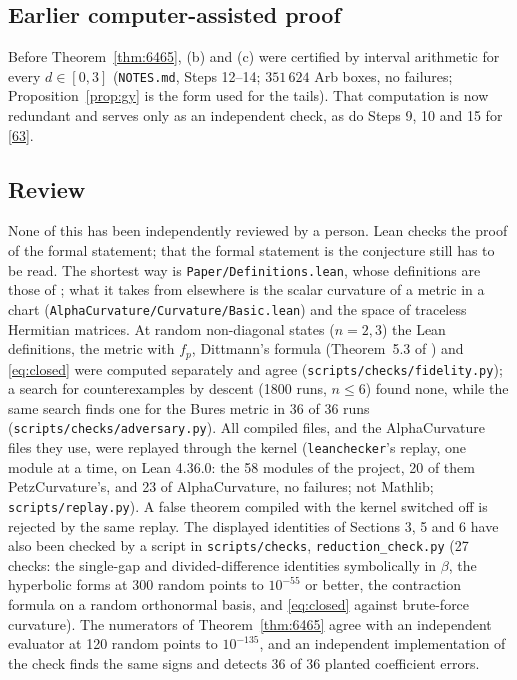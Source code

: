 \documentclass[11pt]{amsart}
\theoremstyle{definition}
\numberwithin{equation}{section}
\begin{document}
\subsection*{Earlier computer-assisted proof} Before Theorem~\ref{thm:6465}, (b) and (c) were certified by interval arithmetic for every $d\in[0,3]$ (\texttt{NOTES.md}, Steps 12--14; $351\,624$ Arb boxes, no failures; Proposition~\ref{prop:gy} is the form used for the tails). That computation is now
redundant and serves only as an independent check, as do Steps 9, 10 and 15 for \eqref{63}.

\subsection*{Review} None of this has been independently reviewed by a person. Lean checks the proof of the formal statement; that the formal statement is the conjecture still has to be read. The shortest way is \texttt{Paper/Definitions.lean}, whose definitions are those of \cite{gi}; what it takes from elsewhere is the scalar curvature of a metric in a chart (\texttt{AlphaCurvature/Curvature/Basic.lean}) and the space of traceless Hermitian matrices.
At random non-diagonal states ($n=2,3$) the Lean definitions, the metric with $f_p$, Dittmann's formula (Theorem~5.3 of \cite{gi}) and \eqref{eq:closed} were computed separately and agree (\texttt{scripts/checks/fidelity.py}); a search for counterexamples by descent (1800 runs, $n\le6$) found none, while the same search finds one for the Bures metric in 36 of 36 runs (\texttt{scripts/checks/adversary.py}). All compiled files, and the AlphaCurvature files they use, were replayed through the kernel (\texttt{leanchecker}'s replay, one module at a time, on Lean 4.36.0: the 58 modules of the project, 20 of them PetzCurvature's, and 23 of AlphaCurvature, no failures; not Mathlib; \texttt{scripts/replay.py}). A false theorem compiled with the kernel switched off is rejected by the same replay.
The displayed identities of Sections 3, 5 and 6 have also been checked by a script in \texttt{scripts/checks}, \texttt{reduction\_check.py} (27 checks: the single-gap and divided-difference identities symbolically in
$\beta$, the hyperbolic forms at 300 random points to $10^{-55}$ or better, the contraction formula on a random orthonormal basis, and \eqref{eq:closed} against brute-force curvature). The numerators of Theorem~\ref{thm:6465} agree with an independent evaluator at 120 random points to $10^{-135}$, and an independent implementation of the check finds the same signs and detects 36 of 36 planted coefficient errors.
\end{document}
